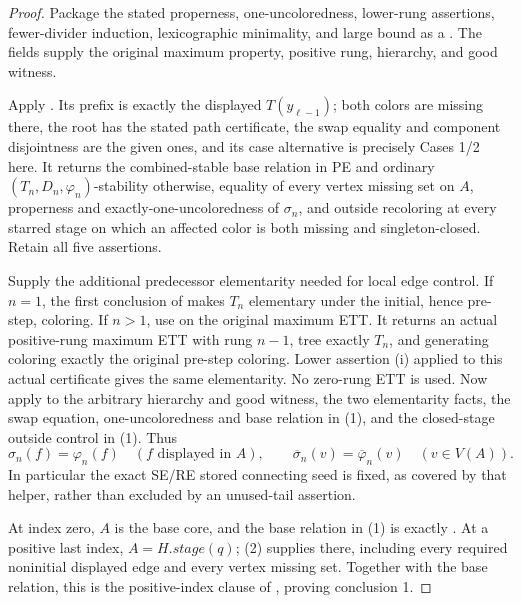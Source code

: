 \begin{proof}
Package the stated properness, one-uncoloredness, lower-rung assertions,
fewer-divider induction, lexicographic minimality, and large bound as
a .
The  fields supply the original maximum
property, positive rung, hierarchy, and good witness.

Apply .  Its prefix is exactly the displayed
$T(y_{\ell-1})$; both colors are missing there, the root has the stated path
certificate, the swap equality and component disjointness are the given
ones, and its case alternative is precisely Cases 1/2 here.
It returns the combined-stable base relation in PE and ordinary
$(T_n,D_n,\varphi_n)$-stability otherwise, equality of every vertex
missing set on $A$, properness and exactly-one-uncoloredness of $\sigma_n$,
and outside recoloring at every starred stage on which an affected color
is both missing and singleton-closed.  Retain all five assertions.       

Supply the additional predecessor elementarity needed for local edge
control.  If $n=1$, the first conclusion of
 makes $T_n$ elementary under the initial,
hence pre-step, coloring.  If $n>1$, use
 on the original maximum ETT.
It returns an actual positive-rung maximum ETT with rung $n-1$,
tree exactly $T_n$, and generating coloring exactly the original
pre-step coloring.  Lower assertion (i) applied to this actual
certificate gives the same elementarity.  No zero-rung ETT is used.
Now apply  to the arbitrary hierarchy
and good witness, the two elementarity facts, the swap equation,
one-uncoloredness and base relation in (1), and the closed-stage outside
control in (1).  Thus
\[
 \sigma_n(f)=\varphi_n(f)\quad(f\text{ displayed in }A),\qquad
 \overline\sigma_n(v)=\overline\varphi_n(v)\quad(v\in V(A)).
                                                                    \tag{2}
\]
In particular the exact SE/RE stored connecting seed is fixed, as covered
by that helper, rather than excluded by an unused-tail assertion.

At index zero, $A$ is the base core, and the base relation in (1) is
exactly .  At a positive last index,
$A=H.\mathit{stage}(q)$; (2) supplies
 there, including every required
noninitial displayed edge and every vertex missing set.  Together with
the base relation, this is the positive-index clause of
, proving conclusion 1.


\end{proof}
